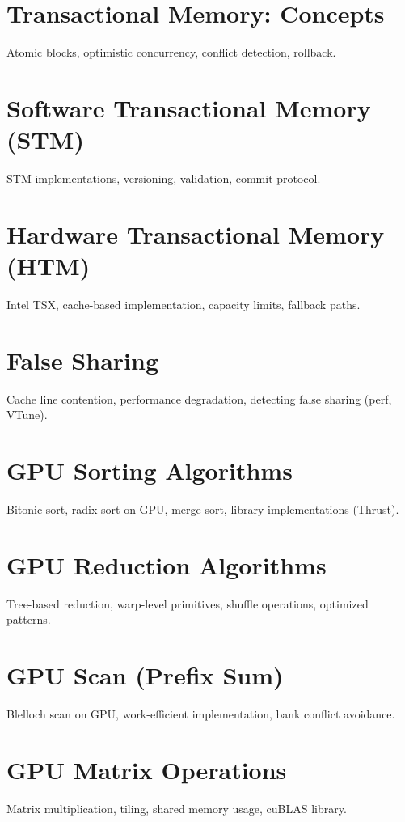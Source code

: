 \chapter{Transactional Memory: Concepts}
Atomic blocks, optimistic concurrency, conflict detection, rollback.

\chapter{Software Transactional Memory (STM)}
STM implementations, versioning, validation, commit protocol.

\chapter{Hardware Transactional Memory (HTM)}
Intel TSX, cache-based implementation, capacity limits, fallback paths.

\chapter{False Sharing}
Cache line contention, performance degradation, detecting false sharing (perf, VTune).


\chapter{GPU Sorting Algorithms}
Bitonic sort, radix sort on GPU, merge sort, library implementations (Thrust).

\chapter{GPU Reduction Algorithms}
Tree-based reduction, warp-level primitives, shuffle operations, optimized patterns.

\chapter{GPU Scan (Prefix Sum)}
Blelloch scan on GPU, work-efficient implementation, bank conflict avoidance.

\chapter{GPU Matrix Operations}
Matrix multiplication, tiling, shared memory usage, cuBLAS library.


